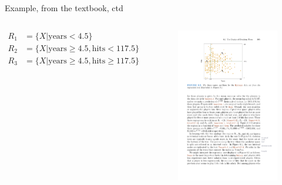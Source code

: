 \documentclass[mathserif, aspectratio=169]{beamer}
\begin{document}
\begin{frame}{Example, from the textbook, ctd}

\begin{columns}

\begin{align*}
R_1 &= \{X|\text{years}<4.5\}\\
R_2 &= \{X|\text{years}\ge 4.5, \text{hits}<117.5 \}\\
R_3 &= \{X|\text{years}\ge 4.5, \text{hits}\ge 117.5\}
\end{align*}
\vspace{-20mm}
\begin{figure}
\includegraphics[height=0.5\textheight]{simple_partitioned_space}
\caption*{}
\end{figure}
\end{columns}

\end{frame}
\end{document}
